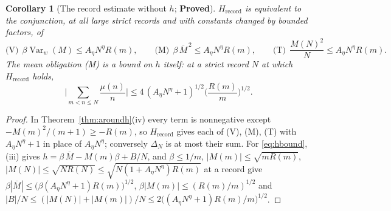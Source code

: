 \documentclass[11pt]{article}
\newtheorem{corollary}[theorem]{Corollary}
\theoremstyle{definition}
\theoremstyle{remark}
\newcommand{\Hrec}{H_{\mathrm{record}}}
\begin{document}
\begin{corollary}[The record estimate without $h$; \textbf{Proved}]\label{cor:aroundh}
$\Hrec$ is equivalent to the conjunction, at all large strict records and with constants changed by bounded factors, of
\[
\text{(V)}\ \ \beta\operatorname{Var}_w(M)\le A_\eta N^\eta R(m),\qquad
\text{(M)}\ \ \beta\,\overline M^{\,2}\le A_\eta N^\eta R(m),\qquad
\text{(T)}\ \ \frac{M(N)^2}N\le A_\eta N^\eta R(m).
\]
The mean obligation (M) is a bound on $h$ itself: at a strict record $N$ at which $\Hrec$ holds,
\begin{equation}\label{eq:hbound}
\Big|\sum_{m<n\le N}\frac{\mu(n)}n\Big|\le4\,(A_\eta N^\eta+1)^{1/2}\Big(\frac{R(m)}m\Big)^{1/2}.
\end{equation}
\end{corollary}

\begin{proof}
In Theorem~\ref{thm:aroundh}(iv) every term is nonnegative except $-M(m)^2/(m+1)\ge-R(m)$, so $\Hrec$ gives each of (V), (M), (T) with $A_\eta N^\eta+1$ in place of $A_\eta N^\eta$; conversely $\Delta_N$ is at most their sum. For \eqref{eq:hbound}, (iii) gives $h=\beta\,\overline M-M(m)\beta+B/N$, and $\beta\le1/m$, $|M(m)|\le\sqrt{mR(m)}$, $|M(N)|\le\sqrt{NR(N)}\le\sqrt{N(1+A_\eta N^\eta)R(m)}$ at a record give $\beta|\overline M|\le\big(\beta(A_\eta N^\eta+1)R(m)\big)^{1/2}$, $\beta|M(m)|\le(R(m)/m)^{1/2}$ and $|B|/N\le(|M(N)|+|M(m)|)/N\le2\big((A_\eta N^\eta+1)R(m)/m\big)^{1/2}$.
\end{proof}
\end{document}
